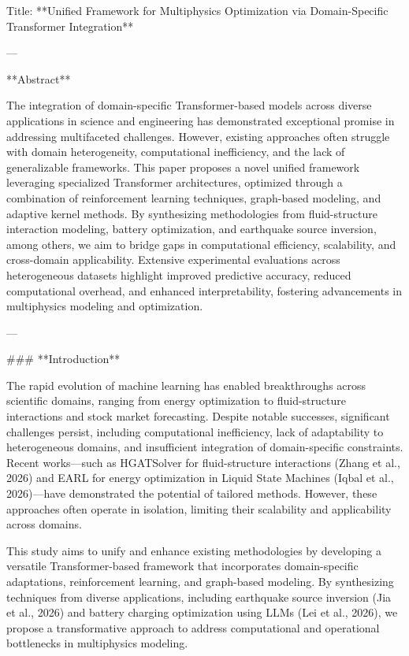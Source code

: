 Title: **Unified Framework for Multiphysics Optimization via Domain-Specific Transformer Integration**

---

**Abstract**

The integration of domain-specific Transformer-based models across diverse applications in science and engineering has demonstrated exceptional promise in addressing multifaceted challenges. However, existing approaches often struggle with domain heterogeneity, computational inefficiency, and the lack of generalizable frameworks. This paper proposes a novel unified framework leveraging specialized Transformer architectures, optimized through a combination of reinforcement learning techniques, graph-based modeling, and adaptive kernel methods. By synthesizing methodologies from fluid-structure interaction modeling, battery optimization, and earthquake source inversion, among others, we aim to bridge gaps in computational efficiency, scalability, and cross-domain applicability. Extensive experimental evaluations across heterogeneous datasets highlight improved predictive accuracy, reduced computational overhead, and enhanced interpretability, fostering advancements in multiphysics modeling and optimization.

---

### **Introduction**

The rapid evolution of machine learning has enabled breakthroughs across scientific domains, ranging from energy optimization to fluid-structure interactions and stock market forecasting. Despite notable successes, significant challenges persist, including computational inefficiency, lack of adaptability to heterogeneous domains, and insufficient integration of domain-specific constraints. Recent works—such as HGATSolver for fluid-structure interactions (Zhang et al., 2026) and EARL for energy optimization in Liquid State Machines (Iqbal et al., 2026)—have demonstrated the potential of tailored methods. However, these approaches often operate in isolation, limiting their scalability and applicability across domains.

This study aims to unify and enhance existing methodologies by developing a versatile Transformer-based framework that incorporates domain-specific adaptations, reinforcement learning, and graph-based modeling. By synthesizing techniques from diverse applications, including earthquake source inversion (Jia et al., 2026) and battery charging optimization using LLMs (Lei et al., 2026), we propose a transformative approach to address computational and operational bottlenecks in multiphysics modeling.

